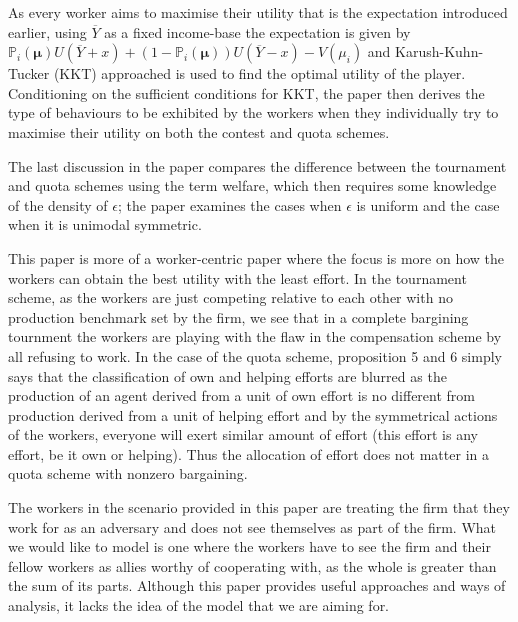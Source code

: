 \documentclass[a4paper,10pt]{article}
\theoremstyle{definition}
\begin{document}
As every worker aims to maximise their utility that is the expectation introduced earlier, using $\overline{Y}$ as a fixed income-base the expectation is given by $\mathbb{P}_i(\mathbf{\mu})U(\overline{Y}+x)+(1-\mathbb{P}_i(\mathbf{\mu}))U(\overline{Y}-x)-V(\mu_i)$
and Karush-Kuhn-Tucker (KKT) approached is used to find the optimal utility of the player. Conditioning on the sufficient conditions for KKT, the paper then derives the type of behaviours to be exhibited by the workers when they individually try to maximise their utility on both the contest and quota schemes.

The last discussion in the paper compares the difference between the tournament and quota schemes using the term welfare, which then requires some knowledge of the density of $\epsilon$; the paper examines the cases when $\epsilon$ is uniform and the case when it is unimodal symmetric.

This paper is more of a worker-centric paper where the focus is more on how the workers can obtain the best utility with the least effort. In the tournament scheme, as the workers are just competing relative to each other with no production benchmark set by the firm, we see that in a complete bargining tournment the workers are playing with the flaw in the compensation scheme by all refusing to work. In the case of the quota scheme, proposition 5 and 6 simply says that the classification of own and helping efforts are blurred as the production of an agent derived from a unit of own effort is no different from production derived from a unit of helping effort and by the symmetrical actions of the workers, everyone will exert similar amount of effort (this effort is any effort, be it own or helping). Thus the allocation of effort does not matter in a quota scheme with nonzero bargaining. 

The workers in the scenario provided in this paper are treating the firm that they work for as an adversary and does not see themselves as part of the firm. What we would like to model is one where the workers have to see the firm and their fellow workers as allies worthy of cooperating with, as the whole is greater than the sum of its parts. Although this paper provides useful approaches and ways of analysis, it lacks the idea of the model that we are aiming for.
\end{document}
